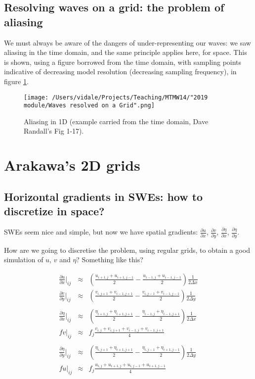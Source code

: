 \subsection{Resolving waves on a grid: the problem of aliasing} 

We must always be aware of the dangers of under-representing our waves: we saw aliasing in the time domain, and the same principle applies here, for space. This is shown, using a figure borrowed from the time domain, with sampling points indicative of decreasing model resolution (decreasing sampling frequency), in figure \ref{fig:Waves-Aliasing}.

\begin{figure}[h!]
	\texttt{[image: /Users/vidale/Projects/Teaching/MTMW14/"2019 module/Waves resolved on a Grid".png]}
	\caption{Aliasing in 1D (example carried from the time domain, Dave Randall's Fig 1-17).}
	    \label{fig:Waves-Aliasing}
\end{figure}

\clearpage

\section{Arakawa's 2D grids}
\subsection { Horizontal gradients in SWEs: how to discretize in space?} 

SWEs seem nice and simple, but now we have spatial gradients: $\frac{\partial u}{\partial x}$, $\frac{\partial v}{\partial y}$, $\frac{\partial \eta}{\partial x}$, $\frac{\partial \eta}{\partial y}$.

How are we going to discretise the problem, using regular grids, to obtain a good simulation of $u$, $v$ and $\eta$? Something like this?

		\begin{eqnarray*}
			\frac{\partial u}{\partial x}\Big|_{ij} &\approx& \left(\frac{u_{i+1,j}+u_{i+1,j-1}}{2} - \frac{u_{i-1,j}+u_{i-1,j-1}}{2} \right)\frac{1}{2 \Delta x} \\
			\frac{\partial v}{\partial y}\Big|_{ij} &\approx& \left(\frac{v_{i,j+1}+v_{i-1,j+1}}{2} - \frac{v_{i,j-1}+v_{i-1,j-1}}{2} \right)\frac{1}{2 \Delta y} \\
			&& \\
			\frac{\partial \eta}{\partial x}\Big|_{ij} &\approx& \left(\frac{\eta_{i+1,j}+\eta_{i+1,j+1}}{2} - \frac{\eta_{i-1,j}+\eta_{i-1,j+1}}{2} \right)\frac{1}{2 \Delta x} \\
			f v\big|_{ij} &\approx& f_j \frac{v_{i,j}+v_{i,j+1}+v_{i-1,j}+v_{i-1,j+1}}{4} \\
			&& \\
			\frac{\partial \eta}{\partial y}\Big|_{ij} &\approx& \left(\frac{\eta_{i,j+1}+\eta_{i+1,j+1}}{2} - \frac{\eta_{i,j-1}+\eta_{i+1,j-1}}{2} \right)\frac{1}{2 \Delta y} \\
			f u\big|_{ij} &\approx& f_j \frac{u_{i,j}+u_{i+1,j}+u_{i,j-1}+u_{i+1,j-1}}{4}
		\end{eqnarray*}
~

